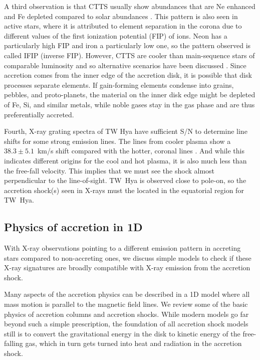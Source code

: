 \documentclass[graybox, nosecnum]{svmult}
\begin{document}
A third observation is that CTTS usually show abundances that are Ne enhanced and Fe depleted compared to solar abundances \citep{Stelzer_2004}. This pattern is also seen in active stars, where it is attributed to element separation in the corona due to different values of the first ionization potential (FIP) of ions. Neon has a particularly high FIP and iron a particularly low one, so the pattern observed is called IFIP (inverse FIP). However, CTTS are cooler than main-sequence stars of comparable luminosity and so alternative scenarios have been discussed \citep{Drake_2005}. Since accretion comes from the inner edge of the accretion disk, it is possible that disk processes separate elements. If gain-forming elements condense into grains, pebbles, and proto-planets, the material on the inner disk edge might be depleted of Fe, Si, and similar metals, while noble gases stay in the gas phase and are thus preferentially accreted. 

Fourth, X-ray grating spectra of TW Hya have sufficient S/N to determine  line shifts for some strong emission lines. The lines from cooler plasma show a $38.3 \pm 5.1$~km/s shift compared with the hotter, coronal lines \cite{2017A&A...607A..14A}. And while this indicates different origins for the cool and hot plasma, it is also much less than the free-fall velocity. This implies that we must see the shock almost perpendicular to the line-of-sight. TW~Hya is observed close to pole-on, so the accretion shock(s) seen in X-rays must the located in the equatorial region for TW~Hya.




\subsection{Physics of accretion in 1D}
\label{sect:accretionphysics}
With X-ray observations pointing to a different emission pattern in accreting stars compared to non-accreting ones, we discuss simple models to check if these X-ray signatures are broadly compatible with X-ray emission from the accretion shock.

Many aspects of the accretion physics can be described in a 1D model where all mass motion is parallel to the magnetic field lines. We review some of the basic physics of accretion columns and accretion shocks. While modern models go far beyond such a simple prescription, the foundation of all accretion shock models still is to convert the gravitational energy in the disk to kinetic energy of the free-falling gas, which in turn gets turned into heat and radiation in the accretion shock.
\end{document}
